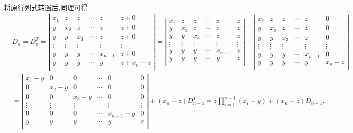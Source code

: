 \documentclass[../../main.tex]{subfiles}%
\begin{document}
\begin{solution}
\begin{align}
\label{eq:递推式1.2}
\end{align}
将原行列式转置后,同理可得
\begin{align}
&D_n=D_{n}^{T}=\left| \begin{matrix}
x_1&		z&		z&		\cdots&		z&		z+0\\
y&		x_2&		z&		\cdots&		z&		z+0\\
y&		y&		x_3&		\cdots&		z&		z+0\\
\vdots&		\vdots&		\vdots&		&		\vdots&		\vdots\\
y&		y&		y&		\cdots&		x_{n-1}&		z+0\\
y&		y&		y&		\cdots&		y&		z+x_n-z\\
\end{matrix} \right|=\left| \begin{matrix}
x_1&		z&		z&		\cdots&		z&		z\\
y&		x_2&		z&		\cdots&		z&		z\\
y&		y&		x_3&		\cdots&		z&		z\\
\vdots&		\vdots&		\vdots&		&		\vdots&		\vdots\\
y&		y&		y&		\cdots&		x_{n-1}&		z\\
y&		y&		y&		\cdots&		y&		z\\
\end{matrix} \right|+\left| \begin{matrix}
x_1&		z&		z&		\cdots&		z&		0\\
y&		x_2&		z&		\cdots&		z&		0\\
y&		y&		x_3&		\cdots&		z&		0\\
\vdots&		\vdots&		\vdots&		&		\vdots&		\vdots\\
y&		y&		y&		\cdots&		x_{n-1}&		0\\
y&		y&		y&		\cdots&		y&		x_n-z\\
\end{matrix} \right|
\nonumber\\
&=\left| \begin{matrix}
x_1-y&		0&		0&		\cdots&		0&		0\\
0&		x_2-y&		0&		\cdots&		0&		0\\
0&		0&		x_3-y&		\cdots&		0&		0\\
\vdots&		\vdots&		\vdots&		&		\vdots&		\vdots\\
0&		0&		0&		\cdots&		x_{n-1}-y&		0\\
y&		y&		y&		\cdots&		y&		z\\
\end{matrix} \right|+\left( x_n-z \right) D_{n-1}^{T}=z\prod\limits_{i=1}^{n-1}{\left( x_i-y \right)}+\left( x_n-z \right) D_{n-1}.

\end{align}
\end{solution}
\end{document}
